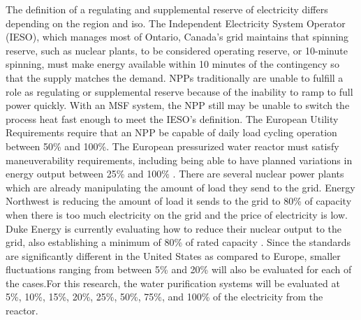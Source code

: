 The definition of a regulating and supplemental reserve of electricity differs depending on the region and \ac{iso}.  The Independent Electricity System Operator (IESO), which manages most of Ontario, Canada's grid maintains that spinning reserve, such as nuclear plants, to be considered operating reserve, or 10-minute spinning, must make energy available within 10 minutes of the contingency so that the supply matches the demand\cite{NERC2014}. NPPs traditionally are unable to fulfill a role as regulating or supplemental reserve because of the inability to ramp to full power quickly.  With an MSF system, the NPP still may be unable to switch the process heat fast enough to meet the IESO's definition. The European Utility Requirements require that an NPP be capable of daily load cycling operation between 50\% and 100\%. The European pressurized water reactor must satisfy maneuverability requirements, including being able to have planned variations in energy output between 25\% and 100\% \cite{Nuclear2011}. There are several nuclear power plants which are already manipulating the amount of load they send to the grid.  Energy Northwest is reducing the amount of load it sends to the grid to 80\% of capacity when there is too much electricity on the grid and the price of electricity is low.  Duke Energy is currently evaluating how to reduce their nuclear output to the grid, also establishing a minimum of 80\% of rated capacity \cite{siphers}.  Since the standards are significantly different in the United States as compared to Europe, smaller fluctuations ranging from between 5\% and 20\% will also be evaluated for each of the cases.For this research, the water purification systems will be evaluated at 5\%, 10\%, 15\%, 20\%, 25\%, 50\%, 75\%, and 100\% of the electricity from the reactor.

